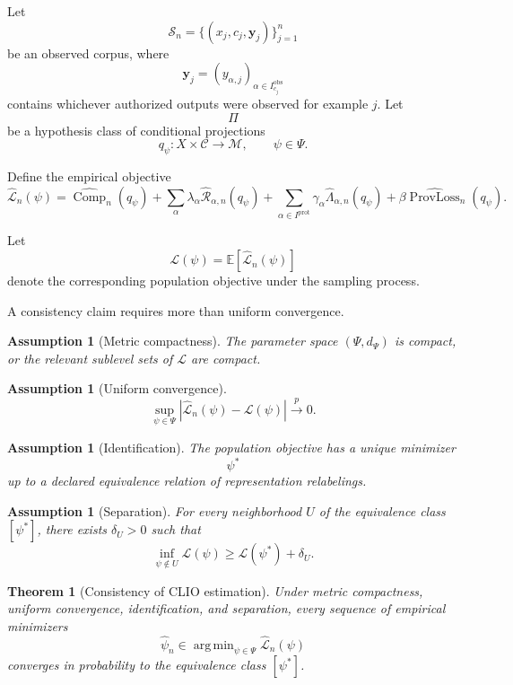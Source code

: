 \documentclass[11pt]{article}
\newtheorem{theorem}[definition]{Theorem}
\newtheorem{assumption}[definition]{Assumption}
\theoremstyle{definition}
\DeclareMathOperator{\argmin}{arg\,min}
\DeclareMathOperator{\Comp}{Comp}
\newcommand{\E}{\mathbb{E}}
\begin{document}
Let
\[
\mathcal S_n
=
\{(x_j,c_j,\mathbf y_j)\}_{j=1}^{n}
\]
be an observed corpus, where
\[
\mathbf y_j
=
(y_{\alpha,j})_{\alpha\in I_{c_j}^{\mathrm{obs}}}
\]
contains whichever authorized outputs were observed for example \(j\). Let
\[
\Pi
\]
be a hypothesis class of conditional projections
\[
q_\psi:X\times\mathcal C\to\mathcal M,
\qquad
\psi\in\Psi.
\]

Define the empirical objective
\[
\widehat{\mathcal L}_n(\psi)
=
\widehat{\Comp}_n(q_\psi)
+
\sum_{\alpha}
\lambda_\alpha
\widehat{\mathcal R}_{\alpha,n}(q_\psi)
+
\sum_{\alpha\in I^{\mathrm{prot}}}
\gamma_\alpha
\widehat{\Lambda}_{\alpha,n}(q_\psi)
+
\beta
\widehat{\operatorname{ProvLoss}}_n(q_\psi).
\]

Let
\[
\mathcal L(\psi)
=
\E[\widehat{\mathcal L}_n(\psi)]
\]
denote the corresponding population objective under the sampling process.

A consistency claim requires more than uniform convergence.

\begin{assumption}[Metric compactness]
The parameter space \((\Psi,d_\Psi)\) is compact, or the relevant sublevel sets of \(\mathcal L\) are compact.
\end{assumption}

\begin{assumption}[Uniform convergence]
\[
\sup_{\psi\in\Psi}
\left|
\widehat{\mathcal L}_n(\psi)
-
\mathcal L(\psi)
\right|
\xrightarrow{p}
0.
\]
\end{assumption}

\begin{assumption}[Identification]
The population objective has a unique minimizer
\[
\psi^{*}
\]
up to a declared equivalence relation of representation relabelings.
\end{assumption}

\begin{assumption}[Separation]
For every neighborhood \(U\) of the equivalence class \([\psi^{*}]\), there exists \(\delta_U>0\) such that
\[
\inf_{\psi\notin U}
\mathcal L(\psi)
\geq
\mathcal L(\psi^{*})+\delta_U.
\]
\end{assumption}

\begin{theorem}[Consistency of CLIO estimation]
Under metric compactness, uniform convergence, identification, and separation, every sequence of empirical minimizers
\[
\widehat\psi_n
\in
\argmin_{\psi\in\Psi}
\widehat{\mathcal L}_n(\psi)
\]
converges in probability to the equivalence class \([\psi^{*}]\).
\end{theorem}
\end{document}
